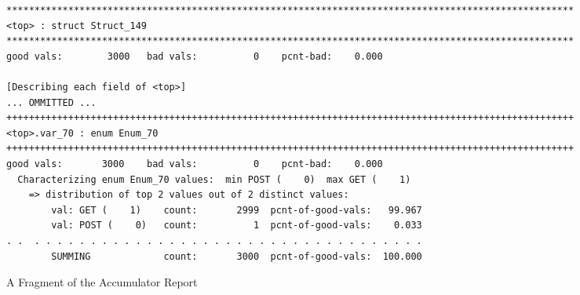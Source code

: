 \documentclass[preprint]{sig-alternate-sigmod08}
\begin{document}


\begin{figure*}
\begin{center}
{\small
\begin{verbatim}
*****************************************************************************************************
<top> : struct Struct_149
*****************************************************************************************************
good vals:        3000   bad vals:          0    pcnt-bad:    0.000

[Describing each field of <top>]
... OMMITTED ...
+++++++++++++++++++++++++++++++++++++++++++++++++++++++++++++++++++++++++++++++++++++++++++++++++++++
<top>.var_70 : enum Enum_70
+++++++++++++++++++++++++++++++++++++++++++++++++++++++++++++++++++++++++++++++++++++++++++++++++++++
good vals:       3000    bad vals:          0    pcnt-bad:    0.000
  Characterizing enum Enum_70 values:  min POST (    0)  max GET (    1)
    => distribution of top 2 values out of 2 distinct values:
        val: GET (    1)    count:       2999  pcnt-of-good-vals:   99.967
        val: POST (    0)   count:          1  pcnt-of-good-vals:    0.033
. .  . . . . . . . . . . . . . . . . . . . . . . . . . . . . . . . . . . .
        SUMMING             count:       3000  pcnt-of-good-vals:  100.000
\end{verbatim}
}
\caption{A Fragment of the Accumulator Report}\label{fig-accum-report}
\end{center}
\end{figure*}
\end{document}
